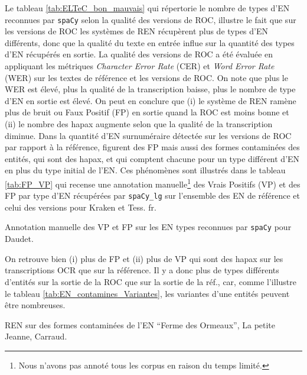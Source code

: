 Le tableau \ref{tab:ELTeC_bon_mauvais} qui répertorie le nombre de types d'EN reconnues par \texttt{spaCy} selon la qualité des versions de ROC, illustre le fait que sur les versions de ROC les systèmes de REN récupèrent plus de types d'EN différents, donc que la qualité du texte en entrée influe sur la quantité des types d'EN récupérés en sortie. La qualité des versions de ROC a été évaluée en appliquant les métriques \textit{Character Error Rate} (CER) et \textit{Word Error Rate} (WER) sur les textes de référence et les versions de ROC. On note que plus le WER est élevé, plus la qualité de la transcription baisse, plus le nombre de type d'EN en sortie est élevé. On peut en conclure que (i) le système de REN ramène plus de bruit ou Faux Positif (FP) en sortie quand la ROC est moins bonne et (ii) le nombre des hapax augmente selon que la qualité de la transcription diminue. 
Dans la quantité d'EN surnuméraire détectée sur les versions de ROC par rapport à la référence, figurent des FP mais aussi des formes contaminées des entités, qui sont des hapax, et qui comptent chacune pour un type différent d'EN en plus du type initial de l'EN. Ces phénomènes sont illustrés dans le tableau \ref{tab:FP_VP} qui recense une annotation manuelle\footnote{Nous n'avons pas annoté tous les corpus en raison du temps limité.} des Vrais Positifs (VP) et des FP par type d'EN récupérées par \texttt{spaCy\_lg} sur l'ensemble des EN de référence et celui des versions pour Kraken et Tess. fr. 
\begin{table}[h!]
\small
    \centering
    
    \caption{Annotation manuelle des VP et FP sur les EN types reconnues par \texttt{spaCy} pour Daudet.}
    \label{tab:FP_VP}
\end{table}

On retrouve bien (i) plus de FP et (ii) plus de VP qui sont des hapax sur les transcriptions OCR que sur la référence. Il y a donc plus de types différents d'entités sur la sortie de la ROC que sur la sortie de la réf., car, comme l'illustre le tableau \ref{tab:EN_contamines_Variantes}, les variantes d'une entités peuvent être nombreuses. 



\begin{table}[h!]
\small
    \centering
    
    \caption{REN sur des formes contaminées de l'EN ``Ferme des Ormeaux'', {\normalfont La petite Jeanne}, Carraud.}
    \label{tab:EN_contamines_Variantes}
\end{table}

